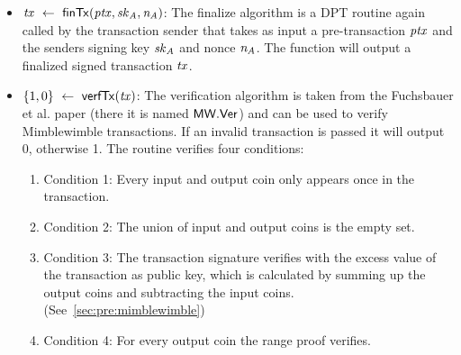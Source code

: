 \begin{definition}
\begin{itemize}
        \item $\mathit{tx} ~\leftarrow~ \mathsf{finTx}(\mathit{ptx},\mathit{sk}_{\mathit{A}},\mathit{\mathit{n}_{\mathit{A}}})$: The finalize algorithm is a DPT routine again called by the transaction sender that takes as input a pre-transaction $\mathit{ptx}$ and the senders signing key $\mathit{sk}_{\mathit{A}}$ and nonce $\mathit{\mathit{n}_{\mathit{A}}}$.
        The function will output a finalized signed transaction $\mathit{tx}$.
        \item $\{1,0\} ~\leftarrow~ \mathsf{verfTx}(\mathit{tx})$: The verification algorithm is taken from the Fuchsbauer et al. paper \cite{fuchsbauer2019aggregate} (there it is named $\mathsf{MW.Ver}$) and can be used to verify Mimblewimble transactions.
        If an invalid transaction is passed it will output 0, otherwise 1.
        The routine verifies four conditions:
        \begin{enumerate}
            \item Condition 1: Every input and output coin only appears once in the transaction.
            \item Condition 2: The union of input and output coins is the empty set.
            \item Condition 3: The transaction signature verifies with the excess value of the transaction as public key, which is calculated by summing up the output coins and subtracting the input coins. (See~\cref{sec:pre:mimblewimble})
            \item Condition 4: For every output coin the range proof verifies.
        \end{enumerate}
    \end{itemize}
\end{definition}

